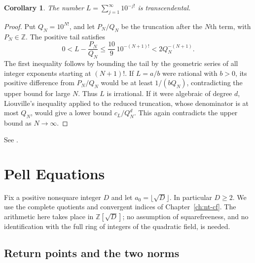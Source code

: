 \documentclass[11pt,oneside,openany]{book}
\theoremstyle{plain}
\newtheorem{corollary}[theorem]{Corollary}
\theoremstyle{definition}
\theoremstyle{remark}
\begin{document}
\begin{corollary}
The number \(\displaystyle L=\sum_{j=1}^{\infty}10^{-j!}\) is
transcendental.
\end{corollary}
\begin{proof}
Put \(Q_N=10^{N!}\), and let \(P_N/Q_N\) be the truncation after the
\(N\)th term, with \(P_N\in\mathbb Z\). The positive tail satisfies
\[
 0<L-\frac{P_N}{Q_N}
 \le\frac{10}{9}\,10^{-(N+1)!}
 <2Q_N^{-(N+1)}.
\]
The first inequality follows by bounding the tail by the geometric
series of all integer exponents starting at \((N+1)!\).
If \(L=a/b\) were rational with \(b>0\), its positive difference
from \(P_N/Q_N\) would be at least \(1/(bQ_N)\), contradicting the
upper bound for large \(N\). Thus \(L\) is irrational.
If it were algebraic of degree \(d\), Liouville's inequality applied
to the reduced truncation, whose denominator is at most \(Q_N\), would
give a lower bound \(c_L/Q_N^d\). This again contradicts the upper
bound as \(N\to\infty\).
\end{proof}

See \cite[Chapter XI, \S11.7]{hardy-wright}.
\chapter{Pell Equations}
\label{ch:nt-pell}

Fix a positive nonsquare integer \(D\) and let \(a_0=\lfloor\sqrt
D\rfloor\). In particular \(D\ge2\). We use the complete quotients and
convergent indices of Chapter~\ref{ch:nt-cf}. The arithmetic here takes
place in \(\mathbb Z[\sqrt D]\); no assumption of squarefreeness, and no
identification with the full ring of integers of the quadratic field,
is needed.

\section{Return points and the two norms}
\end{document}

